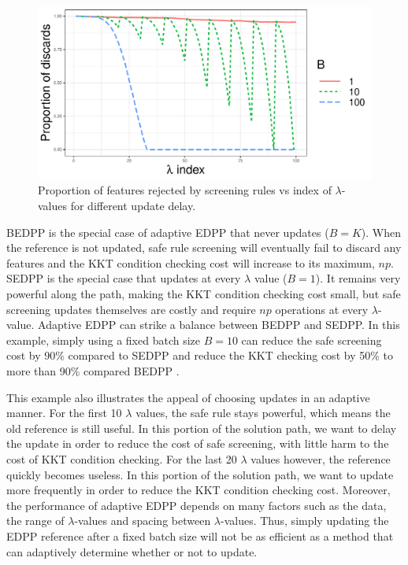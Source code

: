 \begin{figure}[ht]
    \centering
    \includegraphics[scale = 0.6]{plots/batchsizes.pdf}    \caption{Proportion of features rejected by screening rules vs index of $\lambda$-values for different update delay.}
    \label{fig:batchsizes}
\end{figure}

BEDPP is the special case of adaptive EDPP that never updates ($B=K$). When the reference is not updated, safe rule screening will eventually fail to discard any features and the KKT condition checking cost will increase to its maximum, $np$. SEDPP is the special case that updates at every $\lambda$ value ($B=1$). It remains very powerful along the path, making the KKT condition checking cost small, but safe screening updates themselves are costly and require $np$ operations at every $\lambda$-value. Adaptive EDPP can strike a balance between BEDPP and SEDPP. In this example, simply using a fixed batch size $B=10$ can reduce the safe screening cost by 90\% compared to SEDPP and reduce the KKT checking cost by 50\% to more than 90\% compared BEDPP .

This example also illustrates the appeal of choosing updates in an adaptive manner. For the first 10 $\lambda$ values, the safe rule stays powerful, which means the old reference is still useful. In this portion of the solution path, we want to delay the update in order to reduce the cost of safe screening, with little harm to the cost of KKT condition checking. For the last 20 $\lambda$ values however, the reference quickly becomes useless. In this portion of the solution path, we want to update more frequently in order to reduce the KKT condition checking cost. Moreover, the performance of adaptive EDPP depends on many factors such as the data, the range of $\lambda$-values and spacing between $\lambda$-values. Thus, simply updating the EDPP reference after a fixed batch size will not be as efficient as a method that can adaptively determine whether or not to update.

